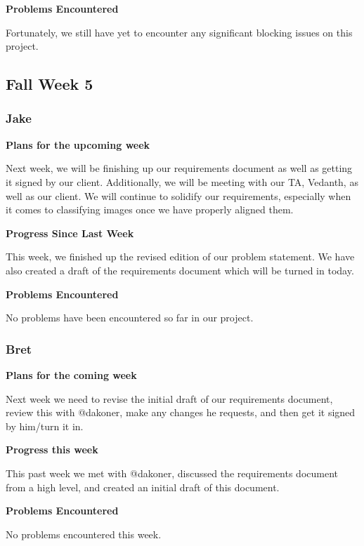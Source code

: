 \documentclass[10pt, onecolumn, draftclsnofoot, letterpaper, compsoc]{IEEEtran}
\begin{document}
    \noindent \textbf{Problems Encountered}

    Fortunately, we still have yet to encounter any significant blocking issues
    on this project.

\subsection{Fall Week 5}

    \subsubsection{Jake}

    \noindent \textbf{Plans for the upcoming week}

    Next week, we will be finishing up our requirements document as well as
    getting it signed by our client. Additionally, we will be meeting with our
    TA, Vedanth, as well as our client. We will continue to solidify our requirements,
    especially when it comes to classifying images once we have properly aligned them.

    \noindent \textbf{Progress Since Last Week}

    This week, we finished up the revised edition of our problem statement. We
    have also created a draft of the requirements document which will be turned in today.

    \noindent \textbf{Problems Encountered}

    No problems have been encountered so far in our project.

    \subsubsection{Bret}

    \noindent \textbf{Plans for the coming week}

    Next week we need to revise the initial draft of our requirements document,
    review this with @dakoner, make any changes he requests, and then get it signed
    by him/turn it in.

    \noindent \textbf{Progress this week}

    This past week we met with @dakoner, discussed the requirements document from
    a high level, and created an initial draft of this document.

    \noindent \textbf{Problems Encountered}

    No problems encountered this week.
\end{document}
